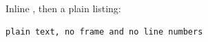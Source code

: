 \documentclass{article}
\begin{document}

Inline , then a plain listing:
\begin{lstlisting}
plain text, no frame and no line numbers
\end{lstlisting}
\end{document}
